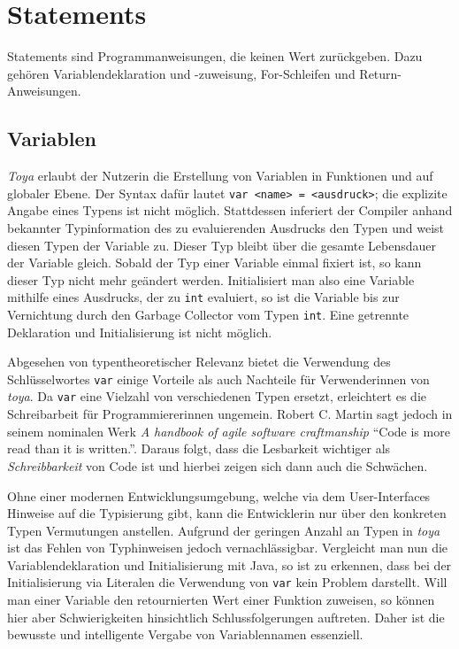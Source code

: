 \section{Statements}

Statements sind Programmanweisungen, die keinen Wert zurückgeben. Dazu gehören Variablendeklaration und -zuweisung, For-Schleifen und Return-Anweisungen.

\subsection{Variablen}
\textit{Toya} erlaubt der Nutzerin die Erstellung von Variablen in Funktionen und auf globaler Ebene. Der Syntax dafür lautet \texttt{var <name> = <ausdruck>}; die explizite Angabe eines Typens ist nicht möglich. Stattdessen inferiert der Compiler anhand bekannter Typinformation des zu evaluierenden Ausdrucks den Typen und weist diesen Typen der Variable zu. Dieser Typ bleibt über die gesamte Lebensdauer der Variable gleich. Sobald der Typ einer Variable einmal fixiert ist, so kann dieser Typ nicht mehr geändert werden. Initialisiert man also eine Variable mithilfe eines Ausdrucks, der zu \texttt{int} evaluiert, so ist die Variable bis zur Vernichtung durch den Garbage Collector vom Typen \texttt{int}. Eine getrennte Deklaration und Initialisierung ist nicht möglich.

Abgesehen von typentheoretischer Relevanz bietet die Verwendung des Schlüsselwortes \texttt{var} einige Vorteile als auch Nachteile für Verwenderinnen von \textit{toya}. Da \texttt{var} eine Vielzahl von verschiedenen Typen ersetzt, erleichtert es die Schreibarbeit für Programmiererinnen ungemein. Robert C. Martin sagt jedoch in seinem nominalen Werk \textit{A handbook of agile software craftmanship} ``Code is more read than it is written.''. Daraus folgt, dass die Lesbarkeit wichtiger als \textit{Schreibbarkeit} von Code ist und hierbei zeigen sich dann auch die Schwächen.

Ohne einer modernen Entwicklungsumgebung, welche via dem User-Interfaces Hinweise auf die Typisierung gibt, kann die Entwicklerin nur über den konkreten Typen Vermutungen anstellen. Aufgrund der geringen Anzahl an Typen in \textit{toya} ist das Fehlen von Typhinweisen jedoch vernachlässigbar. Vergleicht man nun die Variablendeklaration und Initialisierung mit Java, so ist zu erkennen, dass bei der Initialisierung via Literalen die Verwendung von \texttt{var} kein Problem darstellt. Will man einer Variable den retournierten Wert einer Funktion zuweisen, so können hier aber Schwierigkeiten hinsichtlich Schlussfolgerungen auftreten. Daher ist die bewusste und intelligente Vergabe von Variablennamen essenziell.

